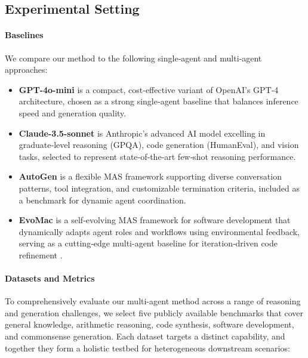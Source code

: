 \documentclass[preprint]{article}
\begin{document}
\subsection{Experimental Setting}
\label{sec:metric}
\paragraph{Baselines} We compare our method to the following single‑agent and multi‑agent approaches:
\begin{itemize}[left=0pt, noitemsep]
    \item \textbf{GPT-4o-mini} \citet{openai2024gpt4omini} is a compact, cost‑effective variant of OpenAI’s GPT‑4 architecture, chosen as a strong single‑agent baseline that balances inference speed and generation quality.
    \item \textbf{Claude-3.5-sonnet} \citet{anthropic2024claude35sonnet} is Anthropic’s advanced AI model excelling in graduate‑level reasoning (GPQA), code generation (HumanEval), and vision tasks, selected to represent state‑of‑the‑art few‑shot reasoning performance.
    \item \textbf{AutoGen} \citet{wu2023autogen} is a flexible MAS framework supporting diverse conversation patterns, tool integration, and customizable termination criteria, included as a benchmark for dynamic agent coordination.
    \item \textbf{EvoMac} \citet{hu2025selfevolving} is a self‑evolving MAS framework for software development that dynamically adapts agent roles and workflows using environmental feedback, serving as a cutting‑edge multi-agent baseline for iteration‑driven code refinement .
\end{itemize}



\paragraph{Datasets and Metrics}
To comprehensively evaluate our multi-agent method across a range of reasoning and generation challenges, we select five publicly available benchmarks that cover general knowledge, arithmetic reasoning, code synthesis, software development, and commonsense generation. Each dataset targets a distinct capability, and together they form a holistic testbed for heterogeneous downstream scenarios:
\end{document}
